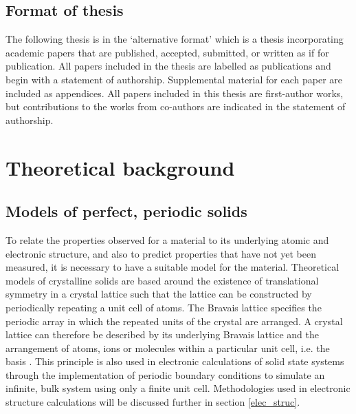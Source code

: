 \documentclass[11pt, twoside]{report}
\begin{document}
\section{Format of thesis}
The following thesis is in the `alternative format' which is a thesis incorporating academic papers that are published, accepted, submitted, or written as if for publication. All papers included in the thesis are labelled as publications and begin with a statement of authorship. Supplemental material for each paper are included as appendices. All papers included in this thesis are first-author works, but contributions to the works from co-authors are indicated in the statement of authorship.



\chapter{Theoretical background}                                                        

\section{Models of perfect, periodic solids}\label{crystal_models}
To relate the properties observed for a material to its underlying atomic and electronic structure, and also to predict properties that have not yet been measured, it is necessary to have a suitable model for the material. Theoretical models of crystalline solids are based around the existence of translational symmetry in a crystal lattice such that the lattice can be constructed by periodically repeating a unit cell of atoms. The Bravais lattice specifies the periodic array in which the repeated units of the crystal are arranged. A crystal lattice can therefore be described by its underlying Bravais lattice and the arrangement of atoms, ions or molecules within a particular unit cell, i.e. the basis \cite{AshcroftMermin2}. This principle is also used in electronic calculations of solid state systems through the implementation of periodic boundary conditions to simulate an infinite, bulk system using only a finite unit cell. Methodologies used in electronic structure calculations will be discussed further in section \ref{elec_struc}.
 
\end{document}
